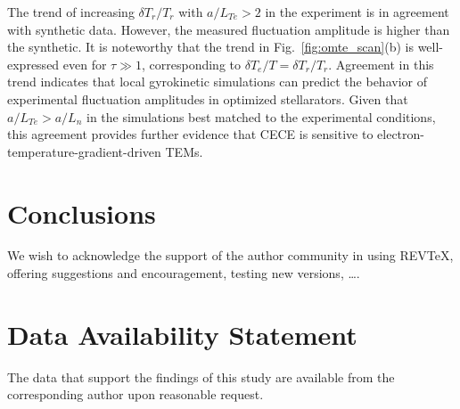 \documentclass[%
 aip,
 amsmath,amssymb,
 reprint,%
]{revtex4-1}
\begin{document}
The trend of increasing $\delta T_r/T_r$ with $a/L_{Te}>2$ in the experiment is in agreement with synthetic data. However, the measured fluctuation amplitude is higher than the synthetic. It is noteworthy that the trend in Fig.\ \ref{fig:omte_scan}(b) is well-expressed even for $\tau \gg 1$, corresponding to $\delta T_e/T= \delta T_r/T_r$. Agreement in this trend indicates that local gyrokinetic simulations can predict the behavior of experimental fluctuation amplitudes in optimized stellarators. Given that $a/L_{Te}>a/L_n$ in the simulations best matched to the experimental conditions, this agreement provides further evidence that CECE is sensitive to electron-temperature-gradient-driven TEMs.






\section{\label{sec:conclusion}Conclusions}


\begin{acknowledgments}
We wish to acknowledge the support of the author community in using
REV\TeX{}, offering suggestions and encouragement, testing new versions,
\dots.
\end{acknowledgments}

\section*{Data Availability Statement}
The data that support the findings of this study are available from the
corresponding author upon reasonable request.

\appendix



\end{document}
